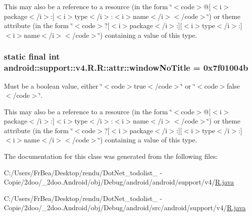 This may also be a reference to a resource (in the form \char`\"{}$<$code$>$@\mbox{[}$<$i$>$package$<$/i$>$:\mbox{]}$<$i$>$type$<$/i$>$:$<$i$>$name$<$/i$>$$<$/code$>$\char`\"{}) or theme attribute (in the form \char`\"{}$<$code$>$?\mbox{[}$<$i$>$package$<$/i$>$:\mbox{]}\mbox{[}$<$i$>$type$<$/i$>$:\mbox{]}$<$i$>$name$<$/i$>$$<$/code$>$\char`\"{}) containing a value of this type. \hypertarget{classandroid_1_1support_1_1v4_1_1_r_1_1attr_2881559b1afe2d87b247be4bbdc651db}{
\subsubsection[{windowNoTitle}]{\setlength{\rightskip}{0pt plus 5cm}static final int android::support::v4.R.R::attr::windowNoTitle = 0x7f01004b}}
\label{classandroid_1_1support_1_1v4_1_1_r_1_1attr_2881559b1afe2d87b247be4bbdc651db}


Must be a boolean value, either \char`\"{}$<$code$>$true$<$/code$>$\char`\"{} or \char`\"{}$<$code$>$false$<$/code$>$\char`\"{}. 

This may also be a reference to a resource (in the form \char`\"{}$<$code$>$@\mbox{[}$<$i$>$package$<$/i$>$:\mbox{]}$<$i$>$type$<$/i$>$:$<$i$>$name$<$/i$>$$<$/code$>$\char`\"{}) or theme attribute (in the form \char`\"{}$<$code$>$?\mbox{[}$<$i$>$package$<$/i$>$:\mbox{]}\mbox{[}$<$i$>$type$<$/i$>$:\mbox{]}$<$i$>$name$<$/i$>$$<$/code$>$\char`\"{}) containing a value of this type. 

The documentation for this class was generated from the following files:\begin{CompactItemize}
\item 
C:/Users/FrBea/Desktop/rendu/DotNet\_\-todolist\_ - Copie/2doo/\_\-2doo.Android/obj/Debug/android/android/support/v4/\hyperlink{android_2support_2v4_2_r_8java}{R.java}\item 
C:/Users/FrBea/Desktop/rendu/DotNet\_\-todolist\_ - Copie/2doo/\_\-2doo.Android/obj/Debug/android/src/android/support/v4/\hyperlink{src_2android_2support_2v4_2_r_8java}{R.java}\end{CompactItemize}
